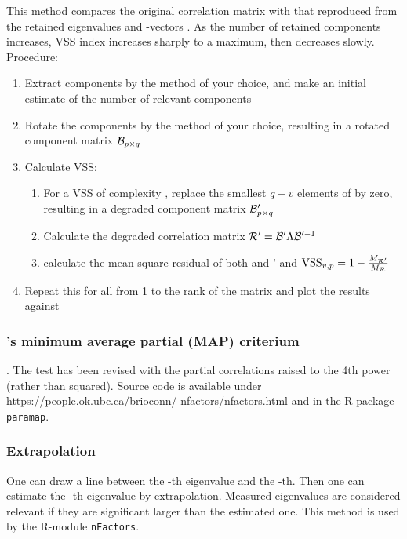This method compares the original correlation matrix with that reproduced from the retained eigenvalues and -vectors \parencite{Rev-79}. As the number of retained components increases, VSS index increases sharply to a maximum, then decreases slowly. Procedure:
\begin{enumerate}
  \item{Extract components by the method of your choice, and make an initial estimate of the number of relevant components }
  \item{Rotate the components by the method of your choice, resulting in a rotated component matrix \(\mathcal{B}_{p \times q} \)}
  \item{Calculate VSS:
    \begin{enumerate}
      \item{For a VSS of complexity , replace the smallest \(q-v \) elements of  by zero, resulting in a degraded component matrix \(\mathcal{B}_{p \times q}' \)}
      \item{Calculate the degraded correlation matrix \(\mathcal{R}' = \mathcal{B}' \Lambda \mathcal{B}'^{-1} \)}
      \item{calculate the mean square residual  of both  and ' and \(\mathrm{VSS}_{v,p} = 1 - \frac{M_{\mathcal{R}'}}{M_{\mathcal{R}}} \)}
    \end{enumerate} }
  \item{Repeat this for all  from 1 to the rank of the matrix and plot the results against }
\end{enumerate}

\subsubsection{'s minimum average partial (MAP) criterium}
\parencite{Vel-76}. The test has been revised with the partial correlations raised to the 4th power
(rather than squared). Source code is available under \href{https://people.ok.ubc.ca/brioconn/nfactors/nfactors.html}{https://people.ok.ubc.ca/brioconn/ nfactors/nfactors.html} and in the R-package \texttt{paramap}.

\subsubsection{Extrapolation}

One can draw a line between the -th eigenvalue and the -th. Then one can estimate the -th eigenvalue by extrapolation. Measured eigenvalues are considered relevant if they are significant larger than the estimated one. This method is used by the R-module \texttt{nFactors}.

